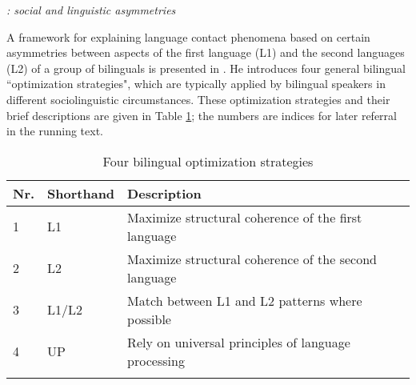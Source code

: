 

\noindent \emph{\cite{muysken2013language}: social and linguistic asymmetries}

\noindent A framework for explaining language contact phenomena based on certain asymmetries between aspects of the first language (L1) and the second languages (L2) of a group of bilinguals is presented in \cite{muysken2013language}. He introduces four general bilingual ``optimization strategies", which are typically applied by bilingual speakers in different sociolinguistic circumstances. These optimization strategies and their brief descriptions are given in Table \ref{tab-muysken_OS}; the numbers are indices for later referral in the running text.

\begin{table}
\caption{Four bilingual optimization strategies}  
\label{tab-muysken_OS}
 \begin{tabular}{lll} 
  \lsptoprule
 Nr. & Shorthand & Description \\ 
  \midrule
  1 & L1 & Maximize structural coherence of the first language \\
  2 & L2 & Maximize structural coherence of the second language\\
  3 & L1/L2 & Match between L1 and L2 patterns where possible\\
  4 & UP & Rely on universal principles of language processing\\
   \lspbottomrule
 \end{tabular}
\end{table}

